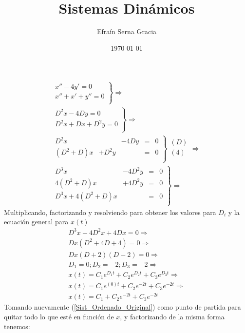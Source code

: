 \documentclass[12pt,spanish,lettersize]{article}
\title{\color{Maroon}Sistemas Din\'amicos}
\author{Efra\'in Serna Gracia}
\date{\color{gray}\today}
\begin{document}
\maketitle
\begin{eqnarray}
\left.
\begin{array}{l}\label{sistema_original}
x''-4y' = 0 \\
x''+x'+y''=0 \\
\end{array}
\right\rbrace \Rightarrow \\
\left.
\begin{array}{l}\label{Sist_Ordenado_Original}
D^2x-4Dy = 0 \\
D^2x+Dx+D^2y=0 \\
\end{array}
\right\rbrace \Rightarrow \\
\left.
\begin{array}{rcccr}
D^2x     &       & -4Dy & = & 0 \\
(D^2+D)x & +D^2y &      & = & 0 \\
\end{array}
\right\rbrace
\left.
\begin{array}{l}
(D) \\
(4) \\
\end{array}
\right. \Rightarrow \\
\left.
\begin{array}{rccr}
D^3x           & -4D^2y & = & 0 \\
4(D^2+D)x      & +4D^2y & = & 0 \\
\hline
D^3x+4(D^2+D)x &        & = & 0 \\ 
\end{array}
\right\rbrace \Rightarrow
\end{eqnarray}
Multiplicando, factorizando y resolviendo para obtener los valores para $D_i$ y la ecuaci\'on general para $x(t)$
\begin{eqnarray}
\nonumber D^3x+4D^2x+4Dx=0 \Rightarrow \\
\nonumber Dx(D^2+4D+4) = 0 \Rightarrow \\
\nonumber Dx(D+2)(D+2)=0\Rightarrow \\
\nonumber D_{1}=0;D_{2}=-2;D_{3}=-2\Rightarrow \\
\nonumber x(t)=C_{1}e^{D_{1}t}+C_{2}e^{D_{2}t}+C_{3}e^{D_{3}t}\Rightarrow \\
\nonumber x(t)=C_{1}e^{(0)t}+C_{2}e^{-2t}+C_{3}e^{-2t} \Rightarrow \\
x(t)=C_{1}+C_{2}e^{-2t}+C_{3}e^{-2t}
\end{eqnarray}
Tomando nuevamente (\ref{Sist_Ordenado_Original}) como punto de partida para quitar todo lo que esté en funci\'on de $x$, y factorizando de la misma forma tenemos:\\
\end{document}
